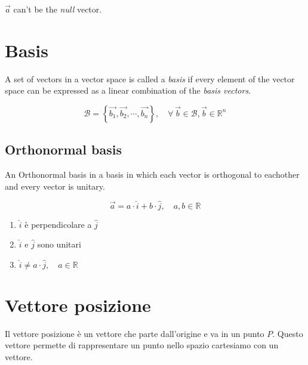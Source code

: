 \documentclass{article}
\begin{document}
\(\vec{a}\) can't be the \textit{null} vector.

\section{Basis}

A set of vectors in a vector space is called a \textit{basis} if every element
of the vector space can be expressed as a linear combination of the \textit{basis vectors}.

\[
    \mathcal{B} =
    \left\{
        \vec{b_1}, 
        \vec{b_2}, 
        \cdots,
        \vec{b_n}
    \right\},
    \quad \forall\, \vec{b} \in \mathcal{B}, \vec{b} \in {\mathbb{R}}^n
\]

\subsection{Orthonormal basis}

An Orthonormal basis in a basis in which each vector is orthogonal to eachother and every vector
is unitary.

\[
    \vec{a} = a \cdot \hat{i} + b \cdot \hat{j},
    \quad a,b \in \mathbb{R}
\]

\begin{enumerate}
    \item \(\hat{i}\) è perpendicolare a \(\hat{j}\)
    \item \(\hat{i}\) e \(\hat{j}\) sono unitari
    \item \(\hat{i} \neq a\cdot\hat{j},\quad a\in \mathbb{R}\)  
\end{enumerate}

\section{Vettore posizione}

Il vettore posizione è un vettore che parte dall'origine e va in un punto \(P\).
Questo vettore permette di rappresentare un punto nello spazio cartesiamo con un vettore.

\pagebreak
\end{document}
